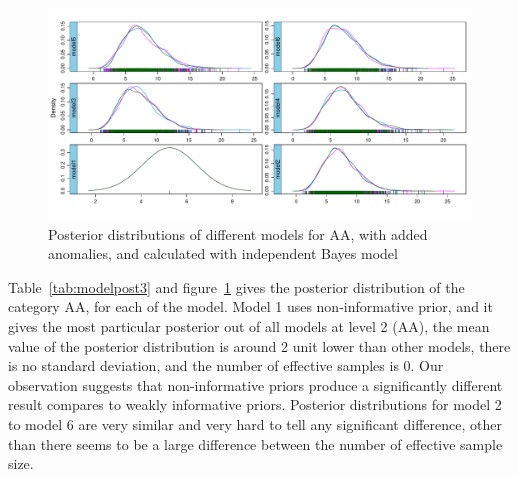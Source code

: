 \begin{figure}[!h]
	\centering
	\includegraphics[width=1\linewidth]{../../R-codes/JAGS/plots/findmodel/DensityAA3abn}
	\caption{Posterior distributions of different models for AA, with added anomalies, and calculated with independent Bayes model}
	\label{fig:densityAA3abn}
\end{figure}

Table~\ref{tab:modelpost3} and figure~\ref{fig:densityAA3abn} gives the posterior distribution of the category AA, for each of the model. Model 1 uses non-informative prior, and it gives the most particular posterior out of all models at level 2 (AA), the mean value of the posterior distribution is around 2 unit lower than other models, there is no standard deviation, and the number of effective samples is 0. Our observation suggests that non-informative priors produce a significantly different result compares to weakly informative priors. Posterior distributions for model 2 to model 6 are very similar and very hard to tell any significant difference, other than there seems to be a large difference between the number of effective sample size.

\newpage

